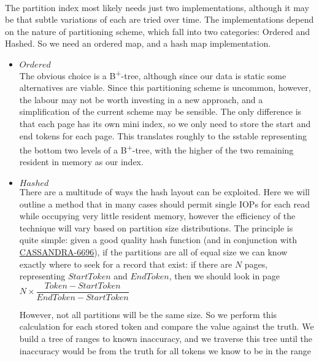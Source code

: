 \documentclass[fleqn]{article}
\begin{document}
\paragraph{}
The partition index most likely needs just two implementations, although it may be that subtle variations
of each are tried over time. The implementations depend on the nature of partitioning scheme, which
fall into two categories: Ordered and Hashed. So we need an ordered map, and a hash map implementation.
\begin{itemize}
  \item $Ordered$\\[2pt]
    The obvious choice is a B\textsuperscript{+}-tree, although since our data is static some alternatives are viable.
    Since this partitioning scheme is uncommon, however, the labour may not be worth investing in a new approach,
    and a simplification of the current scheme may be sensible. The only difference is that each page has its own
    mini index, so we only need to store the start and end tokens for each page. This translates roughly to 
    the sstable representing the bottom two levels of a B\textsuperscript{+}-tree, with the higher 
    of the two remaining resident in memory as our index.
  \item $Hashed$\\[2pt]
    There are a multitude of ways the hash layout can be exploited. Here we will outline
    a method that in many cases should permit single IOPs for each read while occupying very little 
    resident memory, however the efficiency of the technique will vary based on partition size distributions.
    The principle is quite simple: given a good quality hash function (and in conjunction with 
    \href{https://issues.apache.org/jira/browse/CASSANDRA-6696}{CASSANDRA-6696}), if the partitions are
    all of equal size we can know exactly where to seek for a record that  exist: if there
    are $N$ pages, representing $StartToken$ and $EndToken$, then we should look in page $N \times \dfrac{Token - StartToken}{EndToken - StartToken}$
    
    However, not all partitions will be the same size. So we perform this calculation for each stored token
    and compare the value against the truth. We build a tree of ranges to known inaccuracy, and we traverse
    this tree until the inaccuracy
    would be from the truth for all tokens we know to be in the range
    

\end{itemize}
\end{document}
